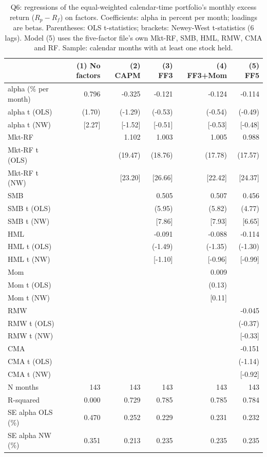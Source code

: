 \begin{table}
\caption{Q6: regressions of the equal-weighted calendar-time portfolio's monthly excess return ($R_p - R_f$) on factors. Coefficients: alpha in percent per month; loadings are betas. Parentheses: OLS t-statistics; brackets: Newey-West t-statistics (6 lags). Model (5) uses the five-factor file's own Mkt-RF, SMB, HML, RMW, CMA and RF. Sample: calendar months with at least one stock held.}
\label{tab:q6}
\begin{tabular}{lrrrrr}
\toprule
 & (1) No factors & (2) CAPM & (3) FF3 & (4) FF3+Mom & (5) FF5 \\
\midrule
alpha (\% per month) & 0.796 & -0.325 & -0.121 & -0.124 & -0.114 \\
alpha t (OLS) & (1.70) & (-1.29) & (-0.53) & (-0.54) & (-0.49) \\
alpha t (NW) & [2.27] & [-1.52] & [-0.51] & [-0.53] & [-0.48] \\
Mkt-RF &  & 1.102 & 1.003 & 1.005 & 0.988 \\
Mkt-RF t (OLS) &  & (19.47) & (18.76) & (17.78) & (17.57) \\
Mkt-RF t (NW) &  & [23.20] & [26.66] & [22.42] & [24.37] \\
SMB &  &  & 0.505 & 0.507 & 0.456 \\
SMB t (OLS) &  &  & (5.95) & (5.82) & (4.77) \\
SMB t (NW) &  &  & [7.86] & [7.93] & [6.65] \\
HML &  &  & -0.091 & -0.088 & -0.114 \\
HML t (OLS) &  &  & (-1.49) & (-1.35) & (-1.30) \\
HML t (NW) &  &  & [-1.10] & [-0.96] & [-0.99] \\
Mom &  &  &  & 0.009 &  \\
Mom t (OLS) &  &  &  & (0.13) &  \\
Mom t (NW) &  &  &  & [0.11] &  \\
RMW &  &  &  &  & -0.045 \\
RMW t (OLS) &  &  &  &  & (-0.37) \\
RMW t (NW) &  &  &  &  & [-0.33] \\
CMA &  &  &  &  & -0.151 \\
CMA t (OLS) &  &  &  &  & (-1.14) \\
CMA t (NW) &  &  &  &  & [-0.92] \\
N months & 143 & 143 & 143 & 143 & 143 \\
R-squared & 0.000 & 0.729 & 0.785 & 0.785 & 0.784 \\
SE alpha OLS (\%) & 0.470 & 0.252 & 0.229 & 0.231 & 0.232 \\
SE alpha NW (\%) & 0.351 & 0.213 & 0.235 & 0.235 & 0.235 \\
\bottomrule
\end{tabular}
\end{table}
